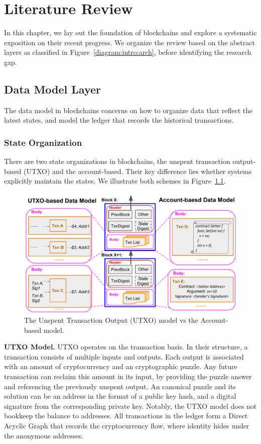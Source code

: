 
\chapter{Literature Review}
\label{ch:literature}
In this chapter, we lay out the foundation of blockchains and explore a systematic exposition on their recent progress.
We organize the review based on the abstract layers as classified in Figure~\ref{diagram:intro:arch}, before identifying the research gap. 

\section{Data Model Layer}
\label{sec:literature:datamodel}
The data model in blochchains concerns on how to organize data that reflect the latest states, and model the ledger that records the historical transactions. 

\subsection{State Organization}
There are two state organizations in blockchains, the unspent transaction output-based (UTXO) and the account-based. Their key difference lies whether systems explicitly maintain the states. We illustrate both schemes in Figure~\ref{diagram:literature:data_model}.

\begin{figure}
    \centering
    \includegraphics[width=0.8\linewidth]{diagram/literature/data_model.pdf}
    \vspace{\BeforeCaptionVSpace}
    \caption{The Unspent Transaction Output (UTXO) model vs the Account-based model. }
    \label{diagram:literature:data_model}
\end{figure}

\textbf{UTXO Model.}
UTXO operates on the transaction basis. In their structure, a transaction consists of multiple inputs and outputs. Each output is associated with an amount of cryptocurrency and an cryptographic puzzle. Any future transaction can reclaim this amount in its input, by providing the puzzle answer and referencing the previously unspent output. An canonical puzzle and its solution can be an address in the format of a public key hash, and a digital signature from the corresponding private key. Notably, the UTXO model does not bookkeep the balance to addresses. All transactions in the ledger form a Direct Acyclic Graph that records the cryptocurrency flow, where identity hides under the anonymous addresses. 

